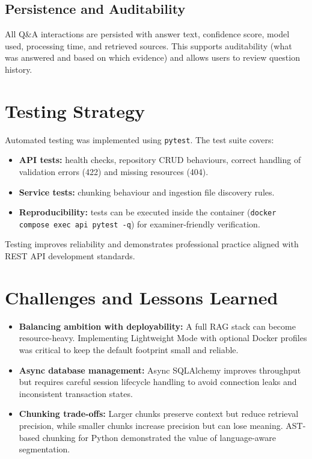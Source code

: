 \documentclass[11pt,a4paper]{article}
\begin{document}
\subsection{Persistence and Auditability}
All Q\&A interactions are persisted with answer text, confidence score, model used, processing time, and retrieved sources. This supports auditability (what was answered and based on which evidence) and allows users to review question history.

\section{Testing Strategy}
Automated testing was implemented using \texttt{pytest}. The test suite covers:
\begin{itemize}[leftmargin=1.2em]
  \item \textbf{API tests:} health checks, repository CRUD behaviours, correct handling of validation errors (422) and missing resources (404).
  \item \textbf{Service tests:} chunking behaviour and ingestion file discovery rules.
  \item \textbf{Reproducibility:} tests can be executed inside the container (\texttt{docker compose exec api pytest -q}) for examiner-friendly verification.
\end{itemize}
Testing improves reliability and demonstrates professional practice aligned with REST API development standards.

\section{Challenges and Lessons Learned}
\begin{itemize}[leftmargin=1.2em]
  \item \textbf{Balancing ambition with deployability:} A full RAG stack can become resource-heavy. Implementing Lightweight Mode with optional Docker profiles was critical to keep the default footprint small and reliable.
  \item \textbf{Async database management:} Async SQLAlchemy improves throughput but requires careful session lifecycle handling to avoid connection leaks and inconsistent transaction states.
  \item \textbf{Chunking trade-offs:} Larger chunks preserve context but reduce retrieval precision, while smaller chunks increase precision but can lose meaning. AST-based chunking for Python demonstrated the value of language-aware segmentation.
\end{itemize}
\end{document}
